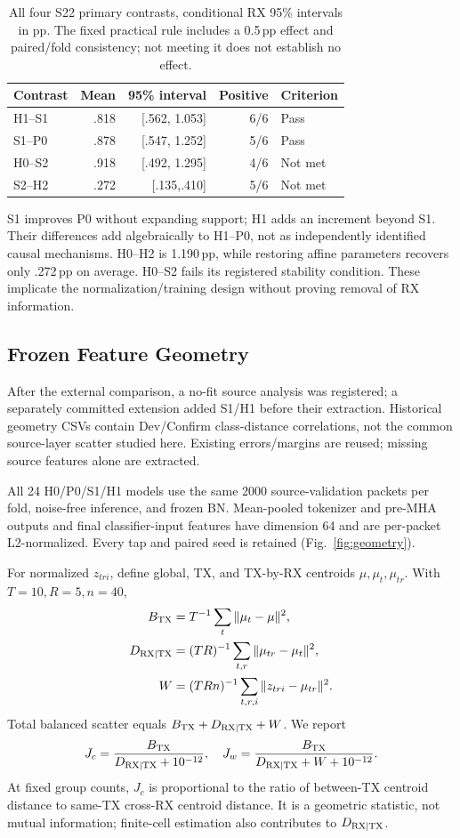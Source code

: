 \documentclass[journal]{IEEEtran}
\begin{document}
\begin{table}[t]\centering
\caption{All four S22 primary contrasts, conditional RX 95\% intervals in pp. The fixed practical rule includes a 0.5\,pp effect and paired/fold consistency; not meeting it does not establish no effect.}
\label{tab:contrasts}
\begin{tabular}{lrrrl}\toprule
Contrast&Mean&95\% interval&Positive&Criterion\\\midrule
H1--S1&.818&[.562, 1.053]&6/6&Pass\\
S1--P0&.878&[.547, 1.252]&5/6&Pass\\
H0--S2&.918&[.492, 1.295]&4/6&Not met\\
S2--H2&.272&[.135,.410]&5/6&Not met\\\bottomrule
\end{tabular}
\end{table}

S1 improves P0 without expanding support; H1 adds an increment beyond S1. Their differences add algebraically to H1--P0, not as independently identified causal mechanisms. H0--H2 is 1.190\,pp, while restoring affine parameters recovers only .272\,pp on average. H0--S2 fails its registered stability condition. These implicate the normalization/training design without proving removal of RX information.

\subsection{Frozen Feature Geometry}
After the external comparison, a no-fit source analysis was registered; a separately committed extension added S1/H1 before their extraction. Historical geometry CSVs contain Dev/Confirm class-distance correlations, not the common source-layer scatter studied here. Existing errors/margins are reused; missing source features alone are extracted.

All 24 H0/P0/S1/H1 models use the same 2000 source-validation packets per fold, noise-free inference, and frozen BN. Mean-pooled tokenizer and pre-MHA outputs and final classifier-input features have dimension 64 and are per-packet L2-normalized. Every tap and paired seed is retained (Fig.~\ref{fig:geometry}).

For normalized $z_{tri}$, define global, TX, and TX-by-RX centroids $\mu,\mu_t,\mu_{tr}$. With $T=10,R=5,n=40$,
\begin{align}
 B_{\rm TX}&=T^{-1}\sum_t\|\mu_t-\mu\|^2,\\
 D_{\rm RX|TX}&=(TR)^{-1}\sum_{t,r}\|\mu_{tr}-\mu_t\|^2,\\
 W&=(TRn)^{-1}\sum_{t,r,i}\|z_{tri}-\mu_{tr}\|^2.
\end{align}
Total balanced scatter equals $B_{\rm TX}+D_{\rm RX|TX}+W$. We report
\begin{equation}
 J_c=\frac{B_{\rm TX}}{D_{\rm RX|TX}+10^{-12}},\quad
 J_w=\frac{B_{\rm TX}}{D_{\rm RX|TX}+W+10^{-12}}.
\end{equation}
At fixed group counts, $J_c$ is proportional to the ratio of between-TX centroid distance to same-TX cross-RX centroid distance. It is a geometric statistic, not mutual information; finite-cell estimation also contributes to $D_{\rm RX|TX}$.
\end{document}
